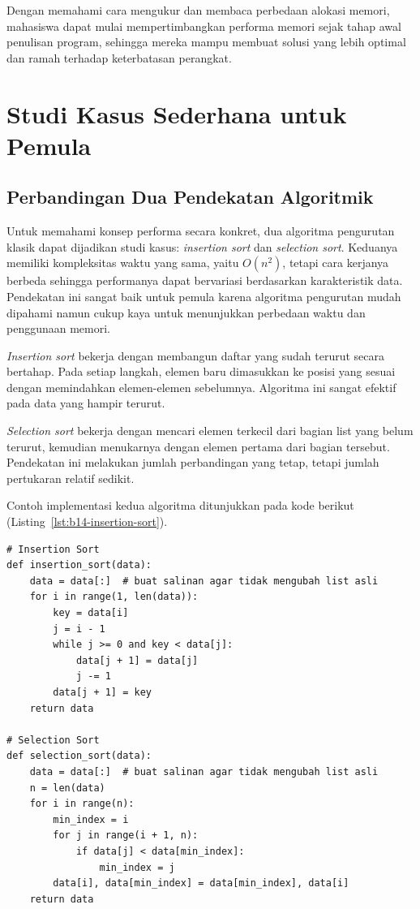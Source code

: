 Dengan memahami cara mengukur dan membaca perbedaan alokasi memori, mahasiswa dapat mulai mempertimbangkan performa memori sejak tahap awal penulisan program, sehingga mereka mampu membuat solusi yang lebih optimal dan ramah terhadap keterbatasan perangkat.


\section{Studi Kasus Sederhana untuk Pemula}

\subsection{Perbandingan Dua Pendekatan Algoritmik}

Untuk memahami konsep performa secara konkret, dua algoritma pengurutan klasik dapat dijadikan studi kasus: \textit{insertion sort} dan \textit{selection sort}. Keduanya memiliki kompleksitas waktu yang sama, yaitu \(O(n^2)\), tetapi cara kerjanya berbeda sehingga performanya dapat bervariasi berdasarkan karakteristik data. Pendekatan ini sangat baik untuk pemula karena algoritma pengurutan mudah dipahami namun cukup kaya untuk menunjukkan perbedaan waktu dan penggunaan memori.

\textit{Insertion sort} bekerja dengan membangun daftar yang sudah terurut secara bertahap. Pada setiap langkah, elemen baru dimasukkan ke posisi yang sesuai dengan memindahkan elemen-elemen sebelumnya. Algoritma ini sangat efektif pada data yang hampir terurut.

\textit{Selection sort} bekerja dengan mencari elemen terkecil dari bagian list yang belum terurut, kemudian menukarnya dengan elemen pertama dari bagian tersebut. Pendekatan ini melakukan jumlah perbandingan yang tetap, tetapi jumlah pertukaran relatif sedikit.

Contoh implementasi kedua algoritma ditunjukkan pada kode berikut (Listing~\ref{lst:b14-insertion-sort}).

\begin{lstlisting}[style=PythonStyle, caption={Insertion Sort}, label={lst:b14-insertion-sort}]
# Insertion Sort
def insertion_sort(data):
    data = data[:]  # buat salinan agar tidak mengubah list asli
    for i in range(1, len(data)):
        key = data[i]
        j = i - 1
        while j >= 0 and key < data[j]:
            data[j + 1] = data[j]
            j -= 1
        data[j + 1] = key
    return data

# Selection Sort
def selection_sort(data):
    data = data[:]  # buat salinan agar tidak mengubah list asli
    n = len(data)
    for i in range(n):
        min_index = i
        for j in range(i + 1, n):
            if data[j] < data[min_index]:
                min_index = j
        data[i], data[min_index] = data[min_index], data[i]
    return data
\end{lstlisting}

